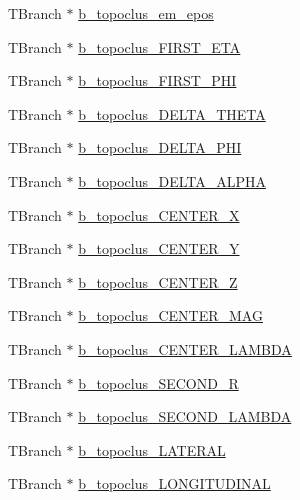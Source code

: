 \begin{DoxyCompactItemize}
T\+Branch $\ast$ \hyperlink{classJetAnalysisExample_ab87573a31af1e9e4b8d1fd601a34b585}{b\+\_\+topoclus\+\_\+em\+\_\+epos}
\item 
T\+Branch $\ast$ \hyperlink{classJetAnalysisExample_a048ee547801caded73f1e18a38280509}{b\+\_\+topoclus\+\_\+\+F\+I\+R\+S\+T\+\_\+\+E\+TA}
\item 
T\+Branch $\ast$ \hyperlink{classJetAnalysisExample_ab7304c48176ccdf65a8063b8cf636b36}{b\+\_\+topoclus\+\_\+\+F\+I\+R\+S\+T\+\_\+\+P\+HI}
\item 
T\+Branch $\ast$ \hyperlink{classJetAnalysisExample_ae3d830fa44711836345cb29491388cea}{b\+\_\+topoclus\+\_\+\+D\+E\+L\+T\+A\+\_\+\+T\+H\+E\+TA}
\item 
T\+Branch $\ast$ \hyperlink{classJetAnalysisExample_a24d521116622d463f2f1cf4f0daaffc1}{b\+\_\+topoclus\+\_\+\+D\+E\+L\+T\+A\+\_\+\+P\+HI}
\item 
T\+Branch $\ast$ \hyperlink{classJetAnalysisExample_a0f5964baf904c646664b1ed4c86d326f}{b\+\_\+topoclus\+\_\+\+D\+E\+L\+T\+A\+\_\+\+A\+L\+P\+HA}
\item 
T\+Branch $\ast$ \hyperlink{classJetAnalysisExample_a807789fc58046a0dd92f071d2a31653b}{b\+\_\+topoclus\+\_\+\+C\+E\+N\+T\+E\+R\+\_\+X}
\item 
T\+Branch $\ast$ \hyperlink{classJetAnalysisExample_a207c6f8eb5762170ee09f4f36da849ae}{b\+\_\+topoclus\+\_\+\+C\+E\+N\+T\+E\+R\+\_\+Y}
\item 
T\+Branch $\ast$ \hyperlink{classJetAnalysisExample_a9697d43cdce4e9cbde661b7c774c74ae}{b\+\_\+topoclus\+\_\+\+C\+E\+N\+T\+E\+R\+\_\+Z}
\item 
T\+Branch $\ast$ \hyperlink{classJetAnalysisExample_ab4ddb3a4006249ed2f1cdc43ec205145}{b\+\_\+topoclus\+\_\+\+C\+E\+N\+T\+E\+R\+\_\+\+M\+AG}
\item 
T\+Branch $\ast$ \hyperlink{classJetAnalysisExample_a1f36767621258973d40d982854f62fce}{b\+\_\+topoclus\+\_\+\+C\+E\+N\+T\+E\+R\+\_\+\+L\+A\+M\+B\+DA}
\item 
T\+Branch $\ast$ \hyperlink{classJetAnalysisExample_a822544d5462af69f964cbd4a2a34a089}{b\+\_\+topoclus\+\_\+\+S\+E\+C\+O\+N\+D\+\_\+R}
\item 
T\+Branch $\ast$ \hyperlink{classJetAnalysisExample_adc6e2c14f28991ce4a289a54fae82486}{b\+\_\+topoclus\+\_\+\+S\+E\+C\+O\+N\+D\+\_\+\+L\+A\+M\+B\+DA}
\item 
T\+Branch $\ast$ \hyperlink{classJetAnalysisExample_a9f08f582fd689c1af51466174e374bdf}{b\+\_\+topoclus\+\_\+\+L\+A\+T\+E\+R\+AL}
\item 
T\+Branch $\ast$ \hyperlink{classJetAnalysisExample_a42e172c22ee81ececcf64e39c9da6ade}{b\+\_\+topoclus\+\_\+\+L\+O\+N\+G\+I\+T\+U\+D\+I\+N\+AL}

\end{DoxyCompactItemize}
